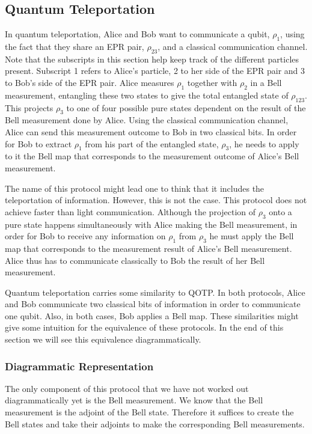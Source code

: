 \documentclass[]{article}
\begin{document}
\subsection{Quantum Teleportation}
\label{subsection:QuantumTeleportation}
In quantum teleportation, Alice and Bob want to communicate a qubit, $\rho_1$, using the fact that they share an EPR pair, $\rho_{23}$, and a classical communication channel. Note that the subscripts in this section help keep track of the different particles present. Subscript 1 refers to Alice's particle, 2 to her side of the EPR pair and 3 to Bob's side of the EPR pair. Alice measures $\rho_1$ together with $\rho_{2}$ in a Bell measurement, entangling these two states to give the total entangled state of $\rho_{123}$. This projects $\rho_{3}$ to one of four possible pure states dependent on the result of the Bell measurement done by Alice. Using the classical communication channel, Alice can send this measurement outcome to Bob in two classical bits. In order for Bob to extract  $\rho_1$ from his part of the entangled state, $\rho_{3}$, he needs to apply to it the Bell map that corresponds to the measurement outcome of Alice's Bell measurement.


The name of this protocol might lead one to think that it includes the teleportation of information. However, this is not the case. This protocol does not achieve faster than light communication. Although the projection of $\rho_{3}$ onto a pure state happens simultaneously with Alice making the Bell measurement, in order for Bob to receive any information on $\rho_1$ from $\rho_{3}$ he must apply the Bell map that corresponds to the measurement result of Alice's Bell measurement. Alice thus has to communicate classically to Bob the result of her Bell measurement.

Quantum teleportation carries some similarity to QOTP. In both protocols, Alice and Bob communicate two classical bits of information in order to communicate one qubit. Also, in both cases, Bob applies a Bell map. These similarities might give some intuition for the equivalence of these protocols. In the end of this section we will see this equivalence diagrammatically.

\subsubsection{Diagrammatic Representation}

The only component of this protocol that we have not worked out diagrammatically yet is the Bell measurement. We know that the Bell measurement is the adjoint of the Bell state. Therefore it suffices to create the Bell states and take their adjoints to make the corresponding Bell measurements.
\end{document}
